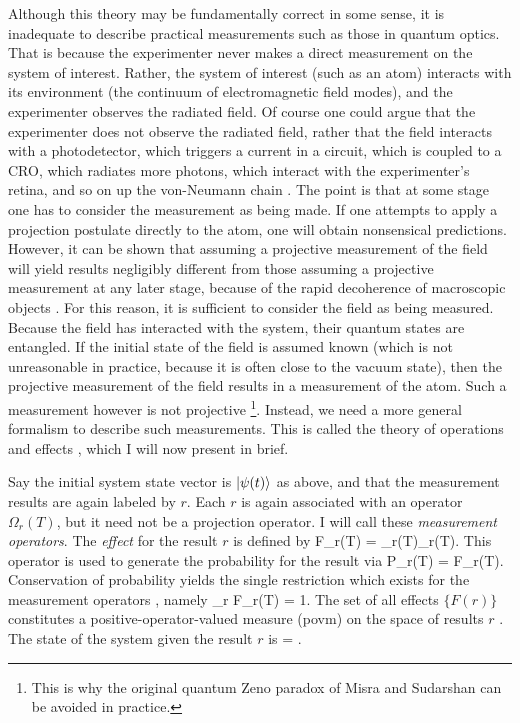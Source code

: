 Although this theory may be fundamentally correct in some sense, it is inadequate
to describe practical measurements such as those in quantum optics. That is
because the experimenter never makes a direct measurement on the system of
interest. Rather, the system of interest (such as an atom) interacts with its
environment (the continuum of electromagnetic field modes), and the experimenter
observes the radiated field. Of course one could argue that the
experimenter does not observe the radiated field, rather that the field interacts
with a photodetector, which triggers a current in a circuit, which is coupled to a
CRO, which radiates more photons, which interact with the experimenter's
retina, and so on up the von-Neumann chain \cite{Von32}. The point is that at some
stage one has to consider the measurement as being made. If one attempts to apply a
projection postulate directly to the atom, one will obtain nonsensical predictions.
However, it can be shown that assuming a projective measurement of the field will
yield results negligibly different from those assuming a projective measurement at
any later stage, because of the rapid decoherence of macroscopic
objects \cite{Zur82}. For this reason, it  is sufficient to consider the field as
being measured. Because the field has interacted with the system, their quantum
states are entangled. If the initial state of the field is assumed known (which is
not unreasonable in practice, because it is often close to the vacuum state), then
the projective measurement of the field results in a measurement of the atom. Such
a measurement however is not projective \footnote{This is why the original quantum
Zeno paradox of Misra and Sudarshan \cite{MisSud77} can be avoided in practice.}.
Instead, we need a more general formalism to describe such measurements. This is
called the theory of operations and effects  \cite{Dav76}, which I will now present
in brief.

Say the initial system state vector is $| {\psi(t)} \rangle$ as above, and that the
measurement results are again labeled by $r$. Each $r$ is again associated with an
operator $\Omega_r(T)$, but it need not be a projection operator. I will call these
{\em measurement operators}.  The {\em effect} \cite{Dav76} for the result $r$ is
defined by  \beq
F_r(T) = \Omega_r(T)\dg \Omega_r(T). \label{hereisfac}
\eeq
This operator is used to generate the probability for the result via
\beq
P_r(T) = F_r(T). \label{onea}
\eeq
Conservation of probability yields the single restriction which exists for the
measurement operators \cite{Dav76}, namely
\beq \label{coef}
\sum_r F_r(T) = 1.
\eeq
The set of all effects $\{ F(r) \}$ constitutes a positive-operator-valued
measure ({\sc povm}) on the space of results $r$ \cite{Dav76}. The state of the system
given the result $r$ is \beq
{} = .
\label{oneb} \eeq

